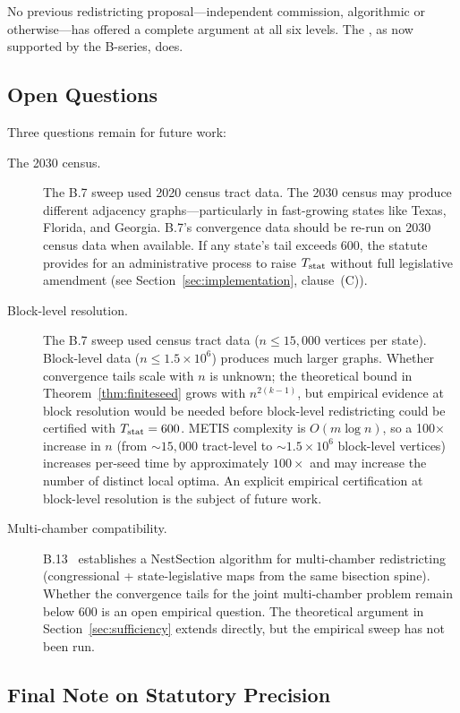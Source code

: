 No previous redistricting proposal---independent commission, algorithmic
or otherwise---has offered a complete argument at all six levels.
The \dia{}, as now supported by the B-series, does.

\subsection{Open Questions}

Three questions remain for future work:

\begin{description}
\item[The 2030 census.]
The B.7 sweep used 2020 census tract data.
The 2030 census may produce different adjacency graphs---particularly in
fast-growing states like Texas, Florida, and Georgia.
B.7's convergence data should be re-run on 2030 census data when available.
If any state's tail exceeds 600, the statute provides for an administrative
process to raise $T_{\mathrm{stat}}$ without full legislative amendment (see
Section~\ref{sec:implementation}, clause~(C)).

\item[Block-level resolution.]
The B.7 sweep used census tract data ($n \le 15{,}000$ vertices per state).
Block-level data ($n \le 1.5 \times 10^6$) produces much larger graphs.
Whether \cs{} convergence tails scale with $n$ is unknown; the theoretical
bound in Theorem~\ref{thm:finiteseed} grows with $n^{2(k-1)}$, but empirical
evidence at block resolution would be needed before block-level redistricting
could be certified with $T_{\mathrm{stat}} = 600$.
METIS complexity is $O(m \log n)$, so a 100$\times$ increase in $n$ (from
${\sim}15{,}000$ tract-level to ${\sim}1.5 \times 10^6$ block-level vertices)
increases per-seed time by approximately $100\times$ and may increase the number
of distinct local optima.
An explicit empirical certification at block-level resolution is the subject
of future work.

\item[Multi-chamber compatibility.]
B.13~\citep{b13paper} establishes a NestSection algorithm for multi-chamber
redistricting (congressional + state-legislative maps from the same bisection
spine).
Whether the \cs{} convergence tails for the joint multi-chamber problem
remain below 600 is an open empirical question.
The theoretical argument in Section~\ref{sec:sufficiency} extends directly,
but the empirical sweep has not been run.
\end{description}

\subsection{Final Note on Statutory Precision}

